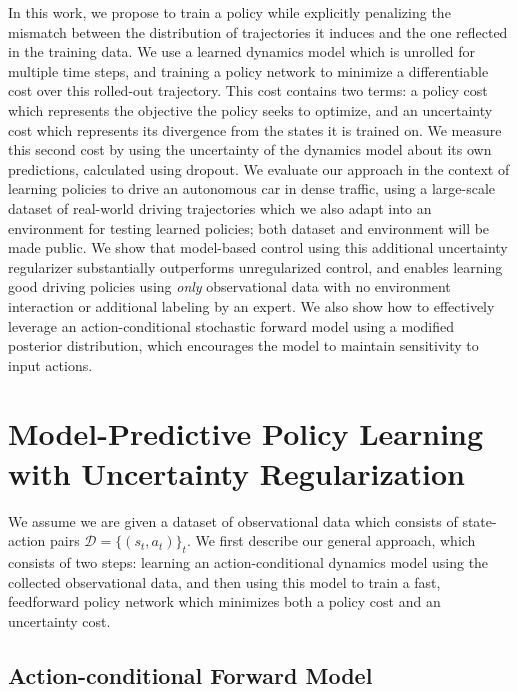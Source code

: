 \documentclass{article} %
\begin{document}
In this work, we propose to train a policy while explicitly penalizing the mismatch between the distribution of trajectories it induces and the one reflected in the training data.
We use a learned dynamics model which is unrolled for multiple time steps, and training a policy network to minimize a differentiable cost over this rolled-out trajectory.
This cost contains two terms: a policy cost which represents the objective the policy seeks to optimize, and an uncertainty cost which represents its divergence from the states it is trained on.
We measure this second cost by using the uncertainty of the dynamics model about its own predictions, calculated using dropout.
We evaluate our approach in the context of learning policies to drive an autonomous car in dense traffic, using a large-scale dataset of real-world driving trajectories which we also adapt into an environment for testing learned policies; both dataset and environment will be made public.
We show that model-based control using this additional uncertainty regularizer substantially outperforms unregularized control, and enables learning good driving policies using \emph{only} observational data with no environment interaction or additional labeling by an expert.
We also show how to effectively leverage an action-conditional stochastic forward model using a modified posterior distribution, which encourages the model to maintain sensitivity to input actions. 


\section{Model-Predictive Policy Learning with Uncertainty Regularization}

We assume we are given a dataset of observational data which consists of state-action pairs $\mathcal{D} = \{(s_t, a_t)\}_t$.
We first describe our general approach, which consists of two steps: learning an action-conditional dynamics model using the collected observational data, and then using this model to train a fast, feedforward policy network which minimizes both a policy cost and an uncertainty cost.

\subsection{Action-conditional Forward Model}
\end{document}
